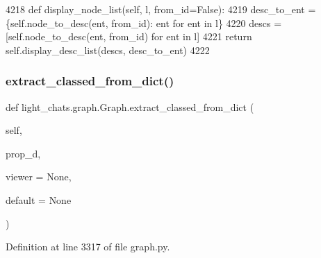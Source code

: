 \begin{DoxyCode}
4218     \textcolor{keyword}{def }display\_node\_list(self, l, from\_id=False):
4219         desc\_to\_ent = \{self.node\_to\_desc(ent, from\_id): ent \textcolor{keywordflow}{for} ent \textcolor{keywordflow}{in} l\}
4220         descs = [self.node\_to\_desc(ent, from\_id) \textcolor{keywordflow}{for} ent \textcolor{keywordflow}{in} l]
4221         \textcolor{keywordflow}{return} self.display\_desc\_list(descs, desc\_to\_ent)
4222 
\end{DoxyCode}
\mbox{\label{classlight__chats_1_1graph_1_1Graph_a4b2f6d6d7714ea3b82ff7a01f3199123}} 
\subsubsection{\texorpdfstring{extract\+\_\+classed\+\_\+from\+\_\+dict()}{extract\_classed\_from\_dict()}}
{\footnotesize\ttfamily def light\+\_\+chats.\+graph.\+Graph.\+extract\+\_\+classed\+\_\+from\+\_\+dict (\begin{DoxyParamCaption}\item[{}]{self,  }\item[{}]{prop\+\_\+d,  }\item[{}]{viewer = {\ttfamily None},  }\item[{}]{default = {\ttfamily None} }\end{DoxyParamCaption})}



Definition at line 3317 of file graph.\+py.


